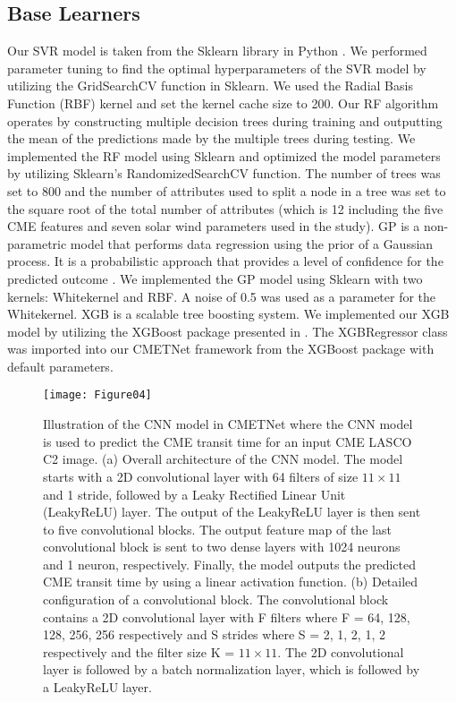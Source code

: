 \documentclass{article}
\begin{document}
\subsection{Base Learners}

Our SVR model is taken from the Sklearn library in Python \citep{DBLP:journals/jmlr/PedregosaVGMTGBPWDVPCBPD11}.
We performed parameter tuning to find the optimal hyperparameters
of the SVR model
by utilizing the GridSearchCV function in Sklearn. 
We used the Radial Basis Function (RBF) kernel
and set the kernel cache size to 200.
Our RF algorithm operates by constructing multiple decision trees during training and 
outputting the mean of the predictions made by the multiple trees during testing. 
We implemented the RF model using Sklearn 
and optimized the model parameters by utilizing Sklearn's RandomizedSearchCV function. 
The number of trees was set to 800 and the number of attributes used to split a node in a tree
was set to the square root of the total number of attributes (which is 12 including
the five CME features and seven solar wind parameters
used in the study).
GP is a non-parametric model that performs data regression using the prior of a Gaussian process. It is a probabilistic approach that provides a level of confidence for the predicted outcome \citep{gortler2019a}. 
We implemented the GP model using Sklearn with two kernels: Whitekernel and RBF. 
A noise of 0.5 was used as a parameter for the Whitekernel. 
XGB is a scalable tree boosting system.
We implemented our XGB model by utilizing the XGBoost package
presented in \citet{DBLP:conf/kdd/ChenG16}. 
The XGBRegressor class was imported into our CMETNet framework from the XGBoost package 
with default parameters. 

\begin{figure*}
\begin{center}
\texttt{[image: Figure04]}
\end{center}
\caption{Illustration of the CNN model in CMETNet where
the CNN model is used to predict the CME transit time for an input CME LASCO C2 image. 
(a) Overall architecture of the CNN model.
The model starts with a 2D convolutional layer with 64 filters of size $11 \times 11$ and 1 stride,
followed by a Leaky Rectified Linear Unit (LeakyReLU) layer. 
The output of the LeakyReLU layer is then sent to
five convolutional blocks.
The output feature map of the last convolutional block 
is sent to two dense layers with 1024 neurons and 1 neuron, respectively. 
Finally, the model outputs the predicted CME transit time by using a linear activation function. 
(b) Detailed configuration of a convolutional block.
The convolutional block contains 
a 2D convolutional layer with 
F filters where F = 64, 128, 128, 256, 256 respectively and
S strides where S = 2, 1, 2, 1, 2 respectively
and the filter size K = $11 \times 11$.
The 2D convolutional layer is followed by a batch normalization layer, 
which is followed by a LeakyReLU layer.}
\label{fig:CNN_model}
\end{figure*}
\end{document}

